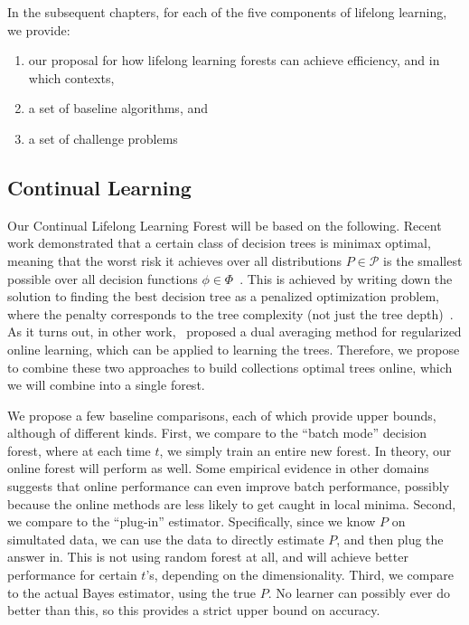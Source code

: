 \documentclass{article}
\begin{document}
In the subsequent chapters,  for each of the five components of lifelong learning, we provide:
\begin{enumerate}
    \item our proposal for how lifelong learning forests can achieve efficiency, and in which contexts,
    \item a set of baseline algorithms, and
    \item a set of challenge problems
\end{enumerate}

\subsection{Continual Learning}

Our Continual Lifelong Learning Forest will be based on the following.  Recent work demonstrated that a certain class of decision trees is minimax optimal, meaning that the worst risk it achieves over all distributions $P \in \mathcal{P}$ is the smallest possible over all decision functions $\phi \in \Phi$~\cite{Scott2006}.  This is achieved by writing down the solution to finding the best decision tree as a penalized optimization problem, where the penalty corresponds to the tree complexity (not just the tree depth)~\cite{Scott2005}. As it turns out, in other work,~\citet{Xiao2010} proposed a dual averaging method for regularized online learning, which can be applied to learning the trees. Therefore, we propose to combine these two approaches to build collections optimal trees online, which we will combine into a single forest. 

We propose a few baseline comparisons, each of which provide upper bounds, although of different kinds.  First, we compare to the ``batch mode'' decision forest, where at each time $t$, we simply train an entire new forest.  In theory, our online forest will perform as well.  Some empirical evidence in other domains suggests that online performance can even improve batch performance, possibly because the online methods are less likely to get caught in local minima.  Second, we compare to the ``plug-in'' estimator.  Specifically, since we know $P$ on simultated data, we can use the data to directly estimate $P$, and then plug the answer in.  This is not using random forest at all, and will achieve better performance for certain $t$'s, depending on the dimensionality.  Third, we compare to the actual Bayes estimator, using the true $P$.  No learner can possibly ever do better than this, so this provides a strict upper bound on accuracy. 
\end{document}
